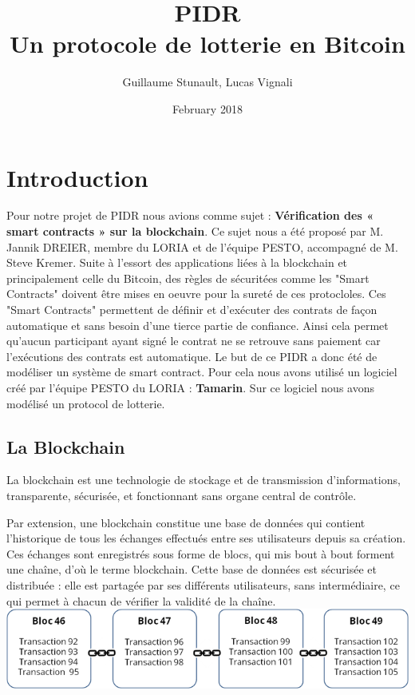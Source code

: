 \documentclass{article}
\title{PIDR \\ \large Un protocole de lotterie en Bitcoin}
\author{Guillaume Stunault, Lucas Vignali}
\date{February 2018}
\begin{document}
\maketitle

\section{Introduction}

Pour notre projet de PIDR nous avions comme sujet : \textbf{Vérification des « smart contracts » sur la blockchain}. Ce sujet nous a été proposé par M. Jannik DREIER, membre du LORIA et de l'équipe PESTO, accompagné de M. Steve Kremer. Suite à l'essort des applications liées à la blockchain et principalement celle du Bitcoin, des règles de sécuritées comme les "Smart Contracts" doivent être mises en oeuvre pour la sureté de ces protocloles. Ces "Smart Contracts" permettent de définir et d'exécuter des contrats de façon automatique et sans besoin d'une tierce partie de confiance. Ainsi cela permet qu'aucun participant ayant signé le contrat ne se retrouve sans paiement car l'exécutions des contrats est automatique. Le but de ce PIDR a donc été de modéliser un système de smart contract. Pour cela nous avons utilisé un logiciel créé par l'équipe PESTO du LORIA : \textbf{Tamarin}. Sur ce logiciel nous avons modélisé un protocol de lotterie.


\subsection{La Blockchain}
La blockchain est une technologie de stockage et de transmission d’informations, transparente, sécurisée, et fonctionnant sans organe central de contrôle.

Par extension, une blockchain constitue une base de données qui contient l’historique de tous les échanges effectués entre ses utilisateurs depuis sa création. Ces échanges sont enregistrés sous forme de blocs, qui mis bout à bout forment une chaîne, d'où le terme blockchain. Cette base de données est sécurisée et distribuée : elle est partagée par ses différents utilisateurs, sans intermédiaire, ce qui permet à chacun de vérifier la validité de la chaîne. \cite{bcfr} \\

\includegraphics{blck-schema.png}
\end{document}
